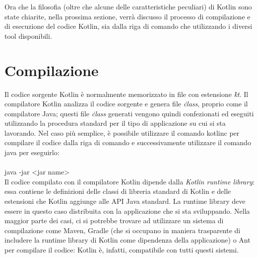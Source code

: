 Ora che la filosofia (oltre che alcune delle caratteristiche peculiari) di Kotlin sono state chiarite, nella prossima sezione, verrà discusso il processo di compilazione e di esecuzione del codice Kotlin, sia dalla riga di comando che utilizzando i diversi tool disponibili.


\section{Compilazione}
Il codice sorgente Kotlin è normalmente memorizzato in file con estensione {\em\.kt}. Il compilatore Kotlin analizza il codice sorgente e genera file {\em\.class}, proprio come il compilatore Java; questi file {\em\.class} generati vengono quindi confezionati ed eseguiti utilizzando la procedura standard per il tipo di applicazione su cui si sta lavorando. Nel caso più semplice, è possibile utilizzare il comando {\ttfamily kotlinc} per compilare il codice dalla riga di comando e successivamente utilizzare il comando {\ttfamily java} per eseguirlo:\\

\\
{\ttfamily java -jar <jar name>}\\

Il codice compilato con il compilatore Kotlin dipende dalla {\em Kotlin runtime library}: essa contiene le definizioni delle classi di libreria standard di Kotlin e delle estensioni che Kotlin aggiunge alle API Java standard. La runtime library deve essere in questo caso distribuita con la applicazione che si sta sviluppando. Nella maggior parte dei casi, ci si potrebbe trovare ad utilizzare un sistema di compilazione come Maven, Gradle (che si occupano in maniera trasparente di includere la runtime library di Kotlin come dipendenza della applicazione) o Ant per compilare il codice: Kotlin è, infatti, compatibile con tutti questi sistemi.\\
